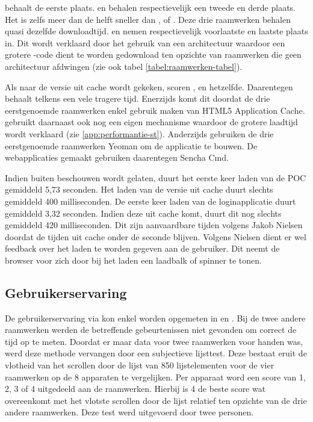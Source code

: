 \lungo{} behaalt de eerste plaats.
\jqm{} en \kendo{} behalen respectievelijk een tweede en derde plaats.
Het is zelfs meer dan de helft sneller dan \jqm{}, \kendo{} of \st{}.
Deze drie raamwerken behalen quasi dezelfde downloadtijd.
\kendo{} en \st{} nemen respectievelijk voorlaatste en laatste plaats in.
Dit wordt verklaard door het gebruik van een architectuur waardoor een grotere \js{}-code dient te worden gedownload ten opzichte van raamwerken die geen architectuur afdwingen (zie ook tabel \ref{tabel:raamwerken-tabel}).

Als naar de versie uit cache wordt gekeken, scoren \kendo{}, \jqm{} en \lungo{} hetzelfde.
Daarentegen behaalt \st{} telkens een vele tragere tijd.
Enerzijds komt dit doordat de drie eerstgenoemde raamwerken enkel gebruik maken van HTML5 Application Cache.
\st{} gebruikt daarnaast ook nog een eigen mechanisme waardoor de grotere laadtijd wordt verklaard (zie \ref{app:performantie-st}).
Anderzijds gebruiken de drie eerstgenoemde raamwerken Yeoman om de applicatie te bouwen.
De webapplicaties gemaakt \st{} gebruiken daarentegen Sencha Cmd.


Indien \st{} buiten beschouwen wordt gelaten, duurt het eerste keer laden van de POC gemiddeld 5,73 seconden. 
Het laden van de versie uit cache duurt slechts gemiddeld 400 milliseconden.
De eerste keer laden van de loginapplicatie duurt gemiddeld 3,32 seconden.
Indien deze uit cache komt, duurt dit nog slechts gemiddeld 420 milliseconden.
Dit zijn aanvaardbare tijden volgens Jakob Nielsen~\cite{Nielsen1993} doordat de tijden uit cache onder de seconde blijven.
Volgens Nielsen dient er wel feedback over het laden te worden gegeven aan de gebruiker.
Dit neemt de browser voor zich door bij het laden een laadbalk of spinner te tonen.


\subsection{Gebruikerservaring}
\label{sec:evaluatie-gebruikerservaring}
De gebruikerservaring via \js{} kon enkel worden opgemeten in \jqm{} en \kendo{}.
Bij de twee andere raamwerken werden de betreffende gebeurtenissen niet gevonden om correct de tijd op te meten.
Doordat er maar data voor twee raamwerken voor handen was, werd deze methode vervangen door een subjectieve lijsttest.
Deze bestaat eruit de vlotheid van het scrollen door de lijst van 850 lijstelementen voor de vier raamwerken op de 8 apparaten te vergelijken.
Per apparaat word een score van 1, 2, 3 of 4 uitgedeeld aan de raamwerken.
Hierbij is 4 de beste score wat overeenkomt met het vlotste scrollen door de lijst relatief ten opzichte van de drie andere raamwerken.
Deze test werd uitgevoerd door twee personen.

